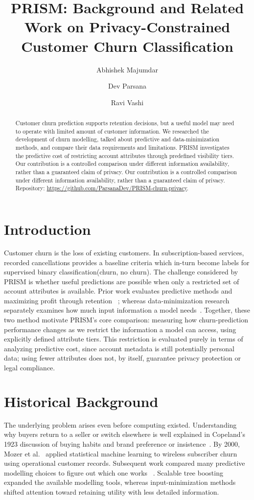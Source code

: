 \documentclass[sigconf,nonacm]{acmart}
\title{PRISM: Background and Related Work on Privacy-Constrained Customer Churn Classification}
\author{Abhishek Majumdar}
\affiliation{\institution{University of Victoria}\city{Victoria}\country{Canada}}
\author{Dev Parsana}
\affiliation{\institution{University of Victoria}\city{Victoria}\country{Canada}}
\author{Ravi Vashi}
\affiliation{\institution{University of Victoria}\city{Victoria}\country{Canada}}
\begin{document}
\begin{abstract}
Customer churn prediction supports retention decisions, but a useful model may need to operate with limited amount of customer information. We researched the development of churn modelling, talked about predictive and data-minimization methods, and compare their data requirements and limitations. PRISM investigates the predictive cost of restricting account attributes through predefined visibility tiers. Our contribution is a controlled comparison under different information availability, rather than a guaranteed claim of privacy. 
Our contribution is a controlled comparison
under different information availability, rather than
a guaranteed claim of privacy.
Repository: \url{https://github.com/ParsanaDev/PRISM-churn-privacy}.
\end{abstract}
\maketitle

\section{Introduction}
Customer churn is the loss of existing customers. In subscription-based services, recorded cancellations provides a baseline criteria which in-turn become labels for supervised binary classification(churn, no churn). The challenge considered by PRISM is whether useful predictions are possible when only a restricted set of account attributes is available. Prior work evaluates predictive methods and maximizing profit through retention ~\cite{mozer,neslin}; whereas data-minimization research separately examines how much input information a model needs~\cite{goldsteen}. Together, these two method motivate PRISM’s core comparison: measuring how churn-prediction performance changes as we restrict the information a model can access, using explicitly defined attribute tiers. This restriction is evaluated purely in terms of analyzing predictive cost, since account metadata is still potentially personal data; using fewer attributes does not, by itself, guarantee privacy protection or legal compliance.

\section{Historical Background}
The underlying problem arises even before computing existed. Understanding why buyers return to a seller or switch elsewhere is well explained in  Copeland's 1923 discussion of buying habits and brand preference or insistence~\cite{copeland}. By 2000, Mozer et al.~\cite{mozer} applied statistical machine learning to wireless subscriber churn using operational customer records. Subsequent work compared many predictive modelling choices to figure out which one works~\cite{neslin} . Scalable tree boosting~\cite{xgboost} expanded the available modelling tools, whereas input-minimization methods~\cite{goldsteen} shifted attention toward retaining utility with less detailed information.
\end{document}
